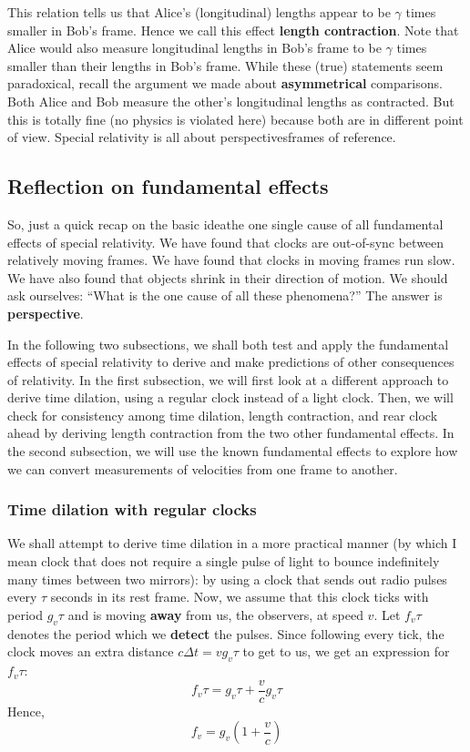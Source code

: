\documentclass[a4paper,11pt]{article}
\numberwithin{equation}{section}
\begin{document}
 \noindent This relation tells us that Alice's (longitudinal) lengths appear to be $\gamma$ times smaller in Bob's frame. Hence we call this effect \textbf{length contraction}. Note that Alice would also measure longitudinal lengths in Bob's frame to be $\gamma$ times smaller than their lengths in Bob's frame. While these (true) statements seem paradoxical, recall the argument we made about \textbf{asymmetrical} comparisons. Both Alice and Bob measure the other's longitudinal lengths as contracted. But this is totally fine (no physics is violated here) because both are in different point of view. Special relativity is all about perspectives\textemdash frames of reference.  
 \subsection{Reflection on fundamental effects}
 So, just a quick recap on the basic idea\textemdash the one single cause of all fundamental effects of special relativity. We have found that clocks are out-of-sync between relatively moving frames. We have found that clocks in moving frames run slow. We have also found that objects shrink in their direction of motion. We should ask ourselves: ``What is the one cause of all these phenomena?'' The answer is \textbf{perspective}.
 
 \noindent In the following two subsections, we shall both test and apply the fundamental effects of special relativity to derive and make predictions of other consequences of relativity. In the first subsection, we will first look at a different approach to derive time dilation, using a regular clock instead of a light clock. Then, we will check for consistency among time dilation, length contraction, and rear clock ahead by deriving length contraction from the two other fundamental effects. In the second subsection, we will use the known fundamental effects to explore how we can convert measurements of velocities from one frame to another. 
 
 \subsubsection{Time dilation with regular clocks}
 We shall attempt to derive time dilation in a more practical manner (by which I mean clock that does not require a single pulse of light to bounce indefinitely many times between two mirrors): by using a clock that sends out radio pulses every $\tau$ seconds in its rest frame. Now, we assume that this clock ticks with period $g_{v}\tau$ and is moving \textbf{away} from us, the observers, at speed $v$. Let $f_{v}\tau$ denotes the period which we \textbf{detect} the pulses. Since following every tick, the clock moves an extra distance $c\Delta t=vg_{v}\tau$ to get to us, we get an expression for $f_{v}\tau$:
 \begin{equation}\label{eq:4.23}
 f_{v}\tau=g_{v}\tau + \frac{v}{c}g_{v}\tau
 \end{equation}
 Hence,
 \begin{equation}\label{eq:4.24}
 f_{v}=g_{v}\left(1+\frac{v}{c}\right)
 \end{equation}
 
\end{document}
